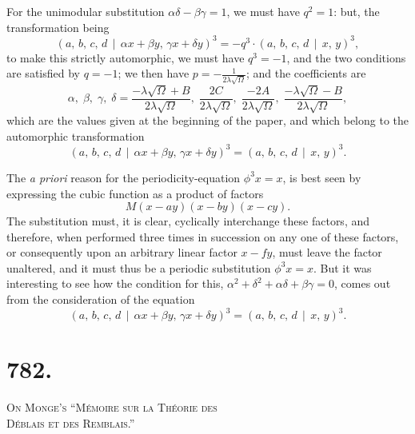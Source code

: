 \documentclass[11pt,a4paper]{book}
\begin{document}
For the unimodular substitution $\alpha\delta - \beta\gamma = 1$, we must have $q^{2} = 1$: but, the transformation being
\[
(a,\, b,\, c,\, d \,\!\!\mid\!\!\, \alpha x + \beta y,\, \gamma x + \delta y)^{3} = -q^{3} \cdot (a,\, b,\, c,\, d \,\!\!\mid\!\!\, x,\, y)^{3},
\]
to make this strictly automorphic, we must have $q^{3} = -1$, and the two conditions are satisfied by $q = -1$; we then have $p = -\frac{1}{2\lambda\sqrt{\Omega}}$; and the coefficients are
\[
\alpha,\; \beta,\; \gamma,\; \delta = \frac{-\lambda\sqrt{\Omega} + B}{2\lambda\sqrt{\Omega}},\; \frac{2C}{2\lambda\sqrt{\Omega}},\; \frac{-2A}{2\lambda\sqrt{\Omega}},\; \frac{-\lambda\sqrt{\Omega} - B}{2\lambda\sqrt{\Omega}},
\]
which are the values given at the beginning of the paper, and which belong to the automorphic transformation
\[
(a,\, b,\, c,\, d \,\!\!\mid\!\!\, \alpha x + \beta y,\, \gamma x + \delta y)^{3} = (a,\, b,\, c,\, d \,\!\!\mid\!\!\, x,\, y)^{3}.
\]

The \textit{a priori} reason for the periodicity-equation $\phi^{3}x = x$, is best seen by expressing the cubic function as a product of factors
\[
M(x - ay)(x - by)(x - cy).
\]
The substitution must, it is clear, cyclically interchange these factors, and therefore, when performed three times in succession on any one of these factors, or consequently upon an arbitrary linear factor $x - fy$, must leave the factor unaltered, and it must thus be a periodic substitution $\phi^{3}x = x$. But it was interesting to see how the condition for this, $\alpha^{2} + \delta^{2} + \alpha\delta + \beta\gamma = 0$, comes out from the consideration of the equation
\[
(a,\, b,\, c,\, d \,\!\!\mid\!\!\, \alpha x + \beta y,\, \gamma x + \delta y)^{3} = (a,\, b,\, c,\, d \,\!\!\mid\!\!\, x,\, y)^{3}.
\]

\newpage

\section*{782.}

\begin{center}
\Large\scshape On Monge's ``M\'{e}moire sur la Th\'{e}orie des\\D\'{e}blais et des Remblais.''
\end{center}
\end{document}
